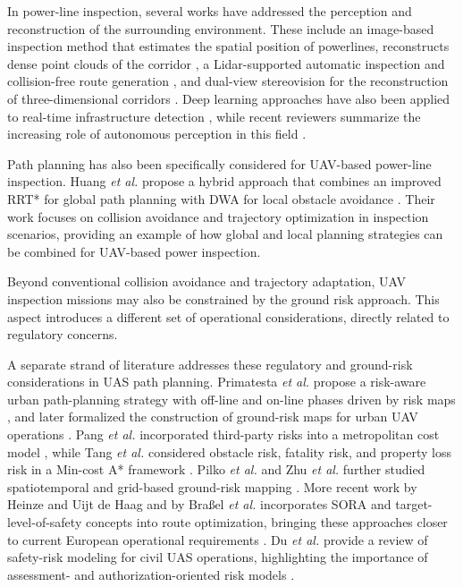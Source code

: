 \documentclass[electronics,article,submit,moreauthors]{Definitions/mdpi}
\DeclareRobustCommand{\deleted}[1]{}%
\DeclareRobustCommand{\added}[1]{#1}%
\DeclareRobustCommand{\deleted}[1]{\textcolor{black}{\sout{#1}}}
\DeclareRobustCommand{\added}[1]{\textcolor{green!50!black}{#1}}
\def\deleted#1{}%
\def\added#1{#1}%
\begin{document}
\added{In power-line inspection, several works have addressed the perception and reconstruction of the surrounding environment. These include an image-based inspection method that estimates the spatial position of powerlines, reconstructs dense point clouds of the corridor \cite{zhang2017powerline}, a Lidar-supported automatic inspection and collision-free route generation \cite{guan2021uavlidar}, and dual-view stereovision for the reconstruction of three-dimensional corridors \cite{zhou2022dualview}. Deep learning approaches have also been applied to real-time infrastructure detection \cite{bellou2024aerial}, while recent reviewers summarize the increasing role of autonomous perception in this field \cite{mendu2025state, faisal2025deep}.}

\added{Path planning has also been specifically considered for UAV-based power-line inspection. Huang \emph{et al.} propose a hybrid approach that combines an improved RRT* for global path planning with DWA for local obstacle avoidance \cite{huang2025hybrid}. Their work focuses on collision avoidance and trajectory optimization in inspection scenarios, providing an example of how global and local planning strategies can be combined for UAV-based power inspection.}

\added{Beyond conventional collision avoidance and trajectory adaptation, UAV inspection missions may also be constrained by the ground risk approach. This aspect introduces a different set of operational considerations, directly related to regulatory concerns.}


A separate strand of literature addresses these regulatory and ground-risk considerations in UAS path planning. Primatesta \emph{et al.} propose a risk-aware urban path-planning strategy with off-line and on-line phases driven by risk maps \cite{primatesta2019riskaware}, and later formalized the construction of ground-risk maps for urban UAV operations \cite{primatesta2020groundrisk}. Pang \emph{et al.} incorporated third-party risks into a metropolitan cost model \cite{pang2022integrated}, while Tang \emph{et al.} considered obstacle risk, fatality risk, and property loss risk in a Min-cost A* framework \cite{tang2023thirdparty}. Pilko \emph{et al.} and Zhu \emph{et al.} further studied spatiotemporal and grid-based ground-risk mapping \cite{pilko2023spatiotemporal,zhang2023groundrisk}. More \deleted{recently}\added{recent} work by Heinze and Uijt de Haag \added{and by }Bra{\ss}el \emph{et al.} incorporates SORA and \deleted{TLS}\added{target-level-of-safety} concepts into route optimization, bringing these approaches closer to current European operational requirements\added{ }\cite{heinze2023sora,brassel2025riskaware}.\added{ }Du \emph{et al.} provide a review\added{ of} safety-risk modeling for civil UAS operations, highlighting the importance of assessment\added{-} and authorization-oriented risk \deleted{modeling}\added{models} \cite{du2024safetyrisk}.
\end{document}
